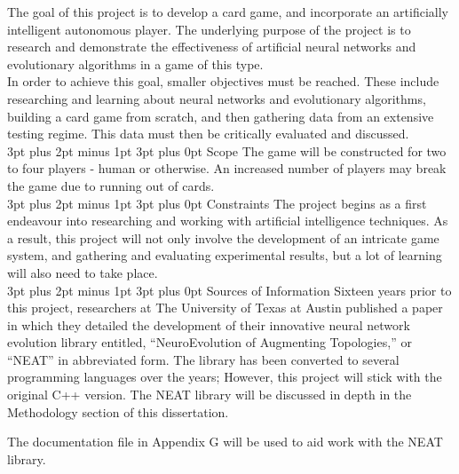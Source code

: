 \documentclass[12pt,a4paper]{article}
\makeatletter
\renewcommand\subsection{\@startsection {subsection}{1}{2mm} %
                               {3pt plus 2pt minus 1pt} %
                               {3pt plus 0pt} %
                               {\normalfont\bfseries}}
\makeatother
\begin{document}
The goal of this project is to develop a card game, and incorporate an artificially intelligent autonomous player. The underlying purpose of the project is to research and demonstrate the effectiveness of artificial neural networks and evolutionary algorithms in a game of this type.  \\

In order to achieve this goal, smaller objectives must be reached. These include researching and learning about neural networks and evolutionary algorithms, building a card game from scratch, and then gathering data from an extensive testing regime. This data must then be critically evaluated and discussed. \\

\subsection{Scope}
The game will be constructed for two to four players - human or otherwise. An increased number of players may break the game due to running out of cards. \\

\subsection{Constraints}
The project begins as a first endeavour into researching and working with artificial intelligence techniques. As a result, this project will not only involve the development of an intricate game system, and gathering and evaluating experimental results, but a lot of learning will also need to take place. \\

\subsection{Sources of Information} 
Sixteen years prior to this project, researchers at The University of Texas at Austin published a paper in which they detailed the development of their innovative neural network evolution library\citep{NEAT} entitled, \enquote{NeuroEvolution of Augmenting Topologies,} or \enquote{NEAT} in abbreviated form. The library has been converted to several programming languages over the years; However, this project will stick with the original C++ version. The NEAT library will be discussed in depth in the Methodology section of this dissertation.

The documentation file in Appendix G will be used to aid work with the NEAT library.\\
\end{document}
